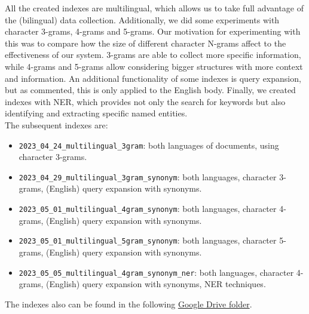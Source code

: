 All the created indexes are multilingual, which allows us to take full advantage of the (bilingual) data collection.
Additionally, we did some experiments with character 3-grams, 4-grams and 5-grams.
Our motivation for experimenting with this was to compare how the size of different character N-grams affect to the
effectiveness of our system.
3-grams are able to collect more specific information, while 4-grams and 5-grams allow considering bigger structures
with more context and information.
An additional functionality of some indexes is query expansion, but as commented, this is only applied to the English
body.
Finally, we created indexes with NER, which provides not only the search for keywords but also identifying and
extracting specific named entities.\\

The subsequent indexes are:
\begin{itemize}
	\item \texttt{2023\_04\_24\_multilingual\_3gram}: both languages of documents, using character 3-grams.
	\item \texttt{2023\_04\_29\_multilingual\_3gram\_synonym}: both languages, character 3-grams, (English) query expansion with synonyms.
	\item \texttt{2023\_05\_01\_multilingual\_4gram\_synonym}: both languages, character 4-grams, (English) query expansion with synonyms.
	\item \texttt{2023\_05\_01\_multilingual\_5gram\_synonym}: both languages, character 5-grams, (English) query expansion with synonyms.
	\item \texttt{2023\_05\_05\_multilingual\_4gram\_synonym\_ner}: both languages, character 4-grams, (English) query expansion with synonyms, NER techniques.
\end{itemize}

The indexes also can be found in the following
\href{https://drive.google.com/drive/folders/1CK_kLeZ5Us3VJe8hiG1vhwPrDs94cLvU?usp=share_link}{Google Drive folder}.\\

